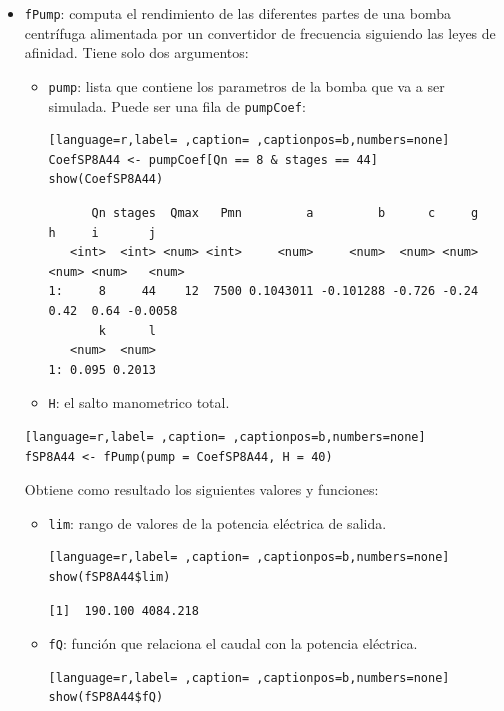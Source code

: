 \begin{itemize}
\item \texttt{fPump}: computa el rendimiento de las diferentes partes de una bomba centrífuga alimentada por un convertidor de frecuencia siguiendo las leyes de afinidad. Tiene solo dos argumentos:
\begin{itemize}
\item \texttt{pump}: lista que contiene los parametros de la bomba que va a ser simulada. Puede ser una fila de \texttt{pumpCoef}:
\begin{lstlisting}[language=r,label= ,caption= ,captionpos=b,numbers=none]
CoefSP8A44 <- pumpCoef[Qn == 8 & stages == 44]
show(CoefSP8A44)
\end{lstlisting}

\begin{verbatim}
      Qn stages  Qmax   Pmn         a         b      c     g     h     i       j
   <int>  <int> <num> <int>     <num>     <num>  <num> <num> <num> <num>   <num>
1:     8     44    12  7500 0.1043011 -0.101288 -0.726 -0.24  0.42  0.64 -0.0058
       k      l
   <num>  <num>
1: 0.095 0.2013
\end{verbatim}

\item \texttt{H}: el salto manometrico total.
\end{itemize}
\begin{lstlisting}[language=r,label= ,caption= ,captionpos=b,numbers=none]
fSP8A44 <- fPump(pump = CoefSP8A44, H = 40)
\end{lstlisting}

Obtiene como resultado los siguientes valores y funciones:
\begin{itemize}
\item \texttt{lim}: rango de valores de la potencia eléctrica de salida.
\begin{lstlisting}[language=r,label= ,caption= ,captionpos=b,numbers=none]
show(fSP8A44$lim)
\end{lstlisting}

\begin{verbatim}
[1]  190.100 4084.218
\end{verbatim}

\item \texttt{fQ}: función que relaciona el caudal con la potencia eléctrica.
\begin{lstlisting}[language=r,label= ,caption= ,captionpos=b,numbers=none]
show(fSP8A44$fQ)
\end{lstlisting}


\end{itemize}
\end{itemize}
